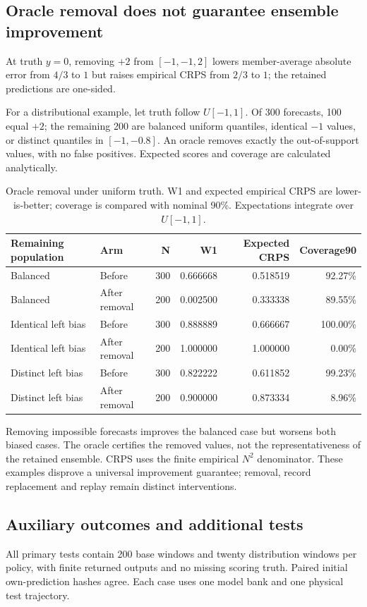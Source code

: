 \documentclass[gmd,manuscript]{copernicus}
\begin{document}
\subsection{Oracle removal does not guarantee ensemble improvement}\label{app:note9}
At truth $y=0$, removing $+2$ from $[-1,-1,2]$ lowers member-average absolute error from $4/3$ to $1$ but raises empirical CRPS from $2/3$ to $1$; the retained predictions are one-sided.

For a distributional example, let truth follow $U[-1,1]$. Of 300 forecasts, 100 equal $+2$; the remaining 200 are balanced uniform quantiles, identical $-1$ values, or distinct quantiles in $[-1,-0.8]$. An oracle removes exactly the out-of-support values, with no false positives. Expected scores and coverage are calculated analytically.

\begin{table}[htbp]
\caption{Oracle removal under uniform truth. W1 and expected empirical CRPS are lower-is-better; coverage is compared with nominal 90\%. Expectations integrate over $U[-1,1]$.}
\label{tab:oracle-removal}
\centering\scriptsize
\begin{tabular}{llrrrr}
\toprule
Remaining population & Arm & N & W1 & Expected CRPS & Coverage90 \\ \midrule
Balanced & Before & 300 & 0.666668 & 0.518519 & 92.27\% \\
Balanced & After removal & 200 & 0.002500 & 0.333338 & 89.55\% \\
Identical left bias & Before & 300 & 0.888889 & 0.666667 & 100.00\% \\
Identical left bias & After removal & 200 & 1.000000 & 1.000000 & 0.00\% \\
Distinct left bias & Before & 300 & 0.822222 & 0.611852 & 99.23\% \\
Distinct left bias & After removal & 200 & 0.900000 & 0.873334 & 8.96\% \\
\bottomrule\end{tabular}
\end{table}



Removing impossible forecasts improves the balanced case but worsens both biased cases. The oracle certifies the removed values, not the representativeness of the retained ensemble. CRPS uses the finite empirical $N^2$ denominator. These examples disprove a universal improvement guarantee; removal, record replacement and replay remain distinct interventions.

\subsection{Auxiliary outcomes and additional tests}\label{app:note10}
All primary tests contain 200 base windows and twenty distribution windows per policy, with finite returned outputs and no missing scoring truth. Paired initial own-prediction hashes agree. Each case uses one model bank and one physical test trajectory.
\end{document}
